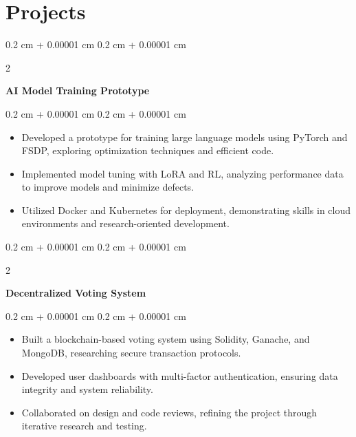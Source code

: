 \documentclass[10pt, letterpaper]{article}
\newenvironment{highlights}{
    \begin{itemize}[
        topsep=0.10 cm,
        parsep=0.10 cm,
        partopsep=0pt,
        itemsep=0pt,
        leftmargin=0.4 cm + 10pt
    ]
}{
    \end{itemize}
} %
\newenvironment{onecolentry}{
    \begin{adjustwidth}{
        0.2 cm + 0.00001 cm
    }{
        0.2 cm + 0.00001 cm
    }
}{
    \end{adjustwidth}
} %
\newenvironment{twocolentry}[2][]{
    \onecolentry
    \def\secondColumn{#2}
    \setcolumnwidth{\fill, 4.5 cm}
    \begin{paracol}{2}
}{
    \switchcolumn \raggedleft \secondColumn
    \end{paracol}
    \endonecolentry
} %
\let\hrefWithoutArrow\href
\renewcommand{\href}[2]{\hrefWithoutArrow{#1}{\ifthenelse{\equal{#2}{}}{ }{#2 }\raisebox{.15ex}{\footnotesize \faExternalLink*}}}
\begin{document}
    \section{Projects}
    \begin{twocolentry}{}
        \textbf{AI Model Training Prototype} \href{https://github.com/deadhearth01/ai-model-prototype}{\faGithub}
    \end{twocolentry}
    \vspace{0.10 cm}
    \begin{onecolentry}
        \begin{highlights}
            \item Developed a prototype for training large language models using PyTorch and FSDP, exploring optimization techniques and efficient code.
            \item Implemented model tuning with LoRA and RL, analyzing performance data to improve models and minimize defects.
            \item Utilized Docker and Kubernetes for deployment, demonstrating skills in cloud environments and research-oriented development.
        \end{highlights}
    \end{onecolentry}
    \vspace{0.10 cm}
    \begin{twocolentry}{}
        \textbf{Decentralized Voting System} \href{https://github.com/deadhearth01/decentralized-voting-system-R307S}{\faGithub}
    \end{twocolentry}
    \vspace{0.10 cm}
    \begin{onecolentry}
        \begin{highlights}
            \item Built a blockchain-based voting system using Solidity, Ganache, and MongoDB, researching secure transaction protocols.
            \item Developed user dashboards with multi-factor authentication, ensuring data integrity and system reliability.
            \item Collaborated on design and code reviews, refining the project through iterative research and testing.
        \end{highlights}
    \end{onecolentry}
\end{document}
